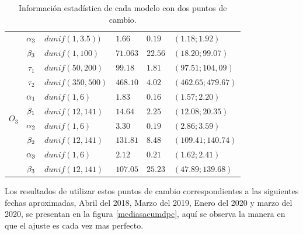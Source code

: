\begin{table}[!h]
\begin{tabular}{|l|c|l|l|l|l|}
& $\alpha_3$& $dunif(1,3.5))$ & $1.66$ & $0.19$ & $(1.18;1.92)$\\  \cline{2-6}
& $\beta_3$& $dunif(1,100)$ & $71.063$ & $22.56$ & $(18.20;99.07)$\\  \cline{1-6}
\multirow{8}{1.5cm}{$O_3$} & $\tau_1$ & $dunif(50,200)$ & $99.18$& $1.81$ & $(97.51;104,09)$\\ \cline{2-6}
& $\tau_2$& $dunif(350,500)$ & $468.10$ & $4.02$ & $(462.65;479.67)$\\  \cline{2-6}
& $\alpha_1$& $dunif(1,6)$ & $1.83$ & $0.16$ & $(1.57;2.20)$\\  \cline{2-6}
& $\beta_1$& $dunif(12,141)$ & $14.64$ & $2.25$ & $(12.08;20.35)$\\  \cline{2-6}
& $\alpha_2$& $dunif(1,6)$ & $3.30$ & $0.19$ & $(2.86;3.59)$\\  \cline{2-6}
& $\beta_2$& $dunif(12, 141)$ & $131.81$ & $8.48$ & $(109.41; 140.74)$\\  \cline{2-6}
& $\alpha_3$& $dunif(1, 6)$ & $2.12$ & $0.21$ & $(1.62;2.41)$\\  \cline{2-6}
& $\beta_3$& $dunif(12, 141)$ & $107.05$ & $25.23$ & $(47.89;139.68)$\\  \cline{1-6}
\end{tabular}
\caption{Información estadística de cada modelo con dos puntos de cambio.}
\label{infoestaddpc}
\end{table}

Los resultados de utilizar estos puntos de cambio correspondientes a las siguientes fechas aproximadas, Abril del 2018, Marzo del 2019, Enero del 2020 y marzo del 2020, se presentan en la figura \ref{mediasacumdpc}, aquí se observa la manera en que el ajuste es cada vez mas perfecto. 

